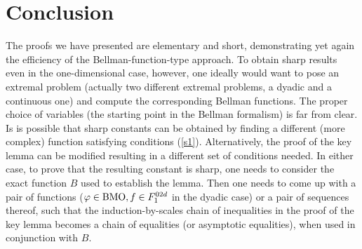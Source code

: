 \documentclass[psamsfonts]{conm-p-l}
\theoremstyle{definition}
\theoremstyle{remark}
\numberwithin{equation}{section}
\begin{document}
\section*{Conclusion}
The proofs we have presented are elementary and short, demonstrating yet again the efficiency of the Bellman-function-type approach. To obtain sharp results even in the one-dimensional case, however, one ideally would want to pose an extremal problem (actually two different extremal problems, a dyadic and a continuous one) and compute the corresponding Bellman functions. The proper choice of variables (the starting point in the Bellman formalism) is far from clear. Is is possible that sharp constants can be obtained by finding a different (more complex) function satisfying conditions (\ref{s1}). Alternatively, the proof of the key lemma can be modified resulting in a different set of conditions needed. In either case, to prove that the resulting constant is sharp, one needs to consider the exact function $B$ used to establish the lemma. Then one needs to come up with a pair of functions ($\varphi\in {{\rm{BMO}}},f\in{F^{02d}_1}$ in the dyadic case) or a pair of sequences thereof, such that the induction-by-scales chain of inequalities in the proof of the key lemma becomes a chain of equalities (or asymptotic equalities), when used in conjunction with $B.$  

\end{document}
